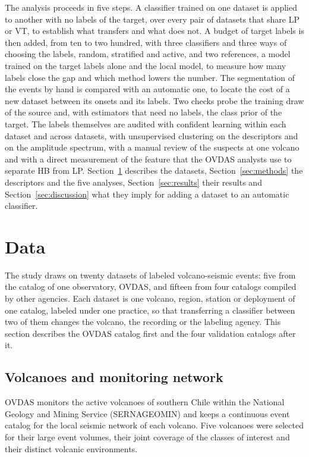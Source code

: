 \documentclass[pdflatex,sn-mathphys-num]{sn-jnl}
\begin{document}
The analysis proceeds in five steps. A classifier trained on one dataset is
applied to another with no labels of the target, over every pair of datasets
that share LP or VT, to establish what transfers and what does not. A budget of target
labels is then added, from ten to two hundred, with three classifiers and three ways of choosing
the labels, random, stratified and active, and two references, a model
trained on the target labels alone and the local model, to measure how many
labels close the gap and which method lowers the number. The segmentation
of the events by hand is compared with an automatic one, to locate the cost
of a new dataset between its onsets and its labels. Two checks probe the training draw of the source
and, with estimators that need no labels, the class prior of the target. The labels themselves are audited with confident learning within
each dataset and across datasets, with unsupervised clustering on the
descriptors and on the amplitude spectrum, with a manual review of the
suspects at one volcano and with a direct measurement of the feature that
the OVDAS analysts use to separate HB from LP. Section~\ref{sec:data}
describes the datasets, Section~\ref{sec:methods} the descriptors and the
five analyses, Section~\ref{sec:results} their results and
Section~\ref{sec:discussion} what they imply for adding a dataset to an
automatic classifier.

\section{Data}\label{sec:data}

The study draws on twenty datasets of labeled volcano-seismic events: five
from the catalog of one observatory, OVDAS, and fifteen from four catalogs
compiled by other agencies. Each dataset is one volcano, region, station or
deployment of one catalog, labeled under one practice,
so that transferring a classifier between two of them changes the volcano,
the recording or the labeling agency. This section describes the OVDAS
catalog first and the four validation catalogs after it.

\subsection{Volcanoes and monitoring network}\label{subsec:area}

OVDAS monitors the active volcanoes of southern Chile within the
National Geology and Mining Service (SERNAGEOMIN) \cite{amigo_volcano_2021}
and keeps a continuous event catalog for the local seismic network of each
volcano. Five volcanoes were selected for their large event volumes, their
joint coverage of the classes of interest and their distinct volcanic
environments.
\end{document}
